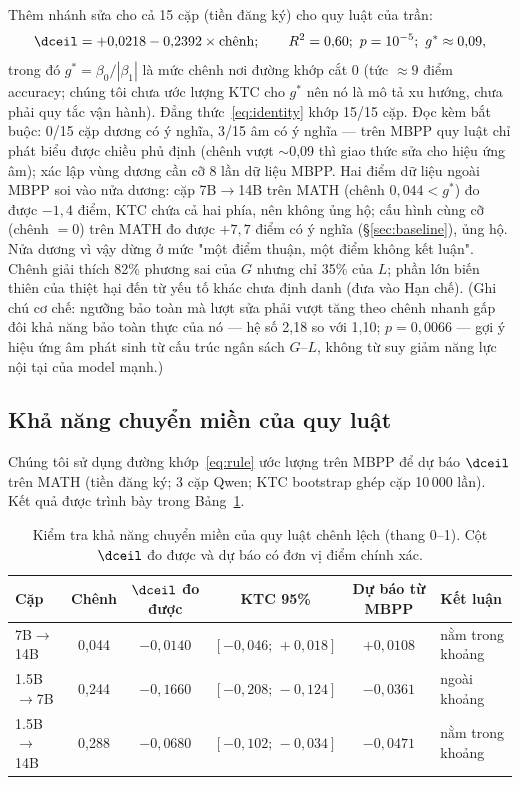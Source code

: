 Thêm nhánh sửa cho cả 15 cặp (tiền đăng ký) cho quy luật của trần:
\begin{equation}\label{eq:rule}
\dceil = +0{,}0218 - 0{,}2392 \times \text{chênh};\qquad R^2 = 0{,}60;\ p = 10^{-5};\
g^\ast \approx 0{,}09,
\end{equation}
trong đó $g^\ast = \beta_0/|\beta_1|$ là mức chênh nơi đường khớp cắt 0 (tức $\approx 9$ điểm accuracy; chúng tôi chưa ước lượng KTC cho $g^\ast$ nên nó là mô tả xu hướng, chưa phải quy tắc vận hành). Đẳng thức~\eqref{eq:identity} khớp 15/15 cặp. Đọc kèm bắt buộc: 0/15 cặp dương có ý nghĩa, 3/15 âm có ý nghĩa --- trên MBPP quy luật chỉ phát biểu được chiều phủ định (chênh vượt $\sim$0,09 thì giao thức sửa cho hiệu ứng âm); xác lập vùng dương cần cỡ 8 lần dữ liệu MBPP. Hai điểm dữ liệu ngoài MBPP soi vào nửa dương: cặp 7B$\to$14B trên MATH (chênh $0{,}044 < g^\ast$) đo được $-1{,}4$ điểm, KTC chứa cả hai phía, nên không ủng hộ; cấu hình cùng cỡ (chênh $=0$) trên MATH đo được $+7{,}7$ điểm có ý nghĩa (\S\ref{sec:baseline}), ủng hộ. Nửa dương vì vậy dừng ở mức "một điểm thuận, một điểm không kết luận". Chênh giải thích 82\% phương sai của $G$ nhưng chỉ 35\% của $L$; phần lớn biến thiên của thiệt hại đến từ yếu tố khác chưa định danh (đưa vào Hạn chế). (Ghi chú cơ chế\mucB: ngưỡng bảo toàn mà lượt sửa phải vượt tăng theo chênh nhanh gấp đôi khả năng bảo toàn thực của nó --- hệ số 2,18 so với 1,10; $p=0{,}0066$ --- gợi ý hiệu ứng âm phát sinh từ cấu trúc ngân sách $G$--$L$, không từ suy giảm năng lực nội tại của model mạnh.)

\subsection{Khả năng chuyển miền của quy luật}\label{sec:transfer}

Chúng tôi sử dụng đường khớp~\eqref{eq:rule} ước lượng trên MBPP để dự báo $\dceil$ trên MATH (tiền đăng ký; 3 cặp Qwen; KTC bootstrap ghép cặp 10\,000 lần). Kết quả được trình bày trong Bảng~\ref{tab:transfer}.

\begin{table}[htbp]
\centering
\small
\begin{tabular}{@{}l c c c c l@{}}
\toprule
Cặp & Chênh & $\dceil$ đo được & KTC 95\% & Dự báo từ MBPP & Kết luận\\
\midrule
7B$\to$14B & 0,044 & $-0{,}0140$ & $[-0{,}046;\,+0{,}018]$ & $+0{,}0108$ & nằm trong khoảng\\
1.5B$\to$7B & 0,244 & $-0{,}1660$ & $[-0{,}208;\,-0{,}124]$ & $-0{,}0361$ & ngoài khoảng\\
1.5B$\to$14B & 0,288 & $-0{,}0680$ & $[-0{,}102;\,-0{,}034]$ & $-0{,}0471$ & nằm trong khoảng\\
\bottomrule
\end{tabular}
\caption{Kiểm tra khả năng chuyển miền của quy luật chênh lệch (thang 0--1). Cột $\dceil$ đo được và dự báo có đơn vị điểm chính xác.}
\label{tab:transfer}
\end{table}

